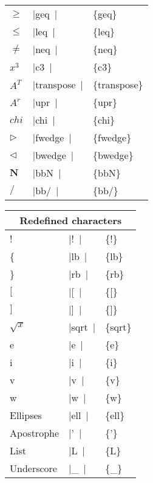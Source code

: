 \documentclass[a4paper,12pt]{article}
\newcommand{\LCDsymb}[1]{\large \textLCD{1}|{#1}~|}
\begin{document}
\begin{center}
\begin{tabular}{|l|l|>{\ttfamily}l|}
        $\geq$     & \LCDsymb{geq}   & \{geq\} \\
        $\leq$     & \LCDsymb{leq}   & \{leq\} \\
        $\neq$     & \LCDsymb{neq}   & \{neq\} \\
        $x^3$      & \LCDsymb{c3}    & \{c3\} \\
        $A^T$      & \LCDsymb{transpose}& \{transpose\} \\
        $A^r$      & \LCDsymb{upr}   & \{upr\} \\
        $chi$      & \LCDsymb{chi}   & \{chi\} \\
        $\triangleright$ & \LCDsymb{fwedge}& \{fwedge\} \\
        $\triangleleft$ & \LCDsymb{bwedge} & \{bwedge\} \\
        $\mathbf{N}$ & \LCDsymb{bbN} & \{bbN\} \\
        $\mathbf{/}$ & \LCDsymb{bb/} & \{bb/\} \\
		\hline
    \end{tabular}
    \newpage
    \begin{tabular}{|l|l|>{\ttfamily}l|}
		\multicolumn{3}{c}{\textbf{Redefined characters}} \\
		\hline
		!          & \LCDsymb{!}     & \{!\} \\
		\{         & \LCDsymb{lb}    & \{lb\} \\
		\}         & \LCDsymb{rb}    & \{rb\} \\
		$[$        & \LCDsymb{[}     & \{[\} \\
		$]$        & \LCDsymb{]}     & \{]\} \\
		$\sqrt{x}$ & \LCDsymb{sqrt}  & \{sqrt\} \\
		e          & \LCDsymb{e}     & \{e\} \\
		i          & \LCDsymb{i}     & \{i\} \\
		v          & \LCDsymb{v}     & \{v\} \\
		w          & \LCDsymb{w}     & \{w\} \\
        Ellipses   & \LCDsymb{ell}   & \{ell\} \\
        Apostrophe & \LCDsymb{'}     & \{'\} \\
        List       & \LCDsymb{L}     & \{L\} \\
        Underscore & \LCDsymb{_}     & \{\_\} \\
		\hline
	\end{tabular}
\end{center}
\end{document}
